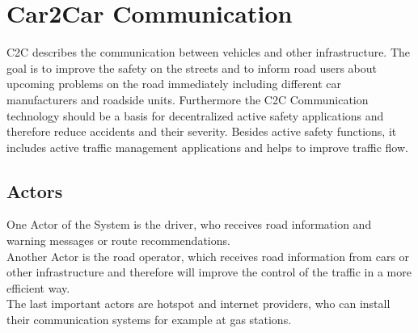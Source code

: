 \chapter{Car2Car Communication}
\label{cha:Car2Car}
C2C describes the communication between vehicles and other infrastructure. The goal is to improve the safety on the streets and to inform road users about upcoming problems on the road immediately including different car manufacturers and roadside units. Furthermore the C2C Communication technology should be a basis for decentralized active safety applications and therefore reduce accidents and their severity. Besides active safety functions, it includes active traffic management applications and helps to improve traffic flow.

\section{Actors}
\label{sec:Actors}
One Actor of the System is the driver, who receives road information and warning messages or route recommendations.\\
Another Actor is the road operator, which receives road information from cars or other infrastructure and therefore will improve the control of the traffic in a more efficient way.\\
The last important actors are hotspot and internet providers, who can install their communication systems for example at gas stations.

